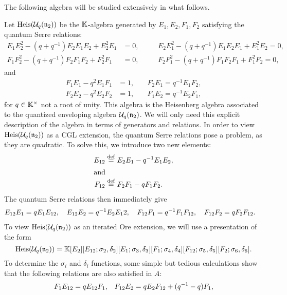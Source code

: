 The following algebra will be studied extensively in what follows.
\begin{example}\label{exmp:heisenberg}
	Let $\operatorname{Heis}(\mathcal{U}_q(\mathfrak{n}_2))$ be the $\mathbb{K}$-algebra generated by $E_1, E_2, F_1, F_2$ satisfying the quantum Serre relations:
	\begin{align*}
		E_1 E_2^2 - (q + q^{-1}) E_2 E_1 E_2 + E_2^2 E_1 & = 0,\quad &  & E_2 E_1^2 - (q + q^{-1}) E_1 E_2 E_1 + E_1^2 E_2 = 0, \\
		F_1 F_2^2 - (q + q^{-1}) F_2 F_1 F_2 + F_2^2 F_1 & = 0,\quad &  & F_2 F_1^2 - (q + q^{-1}) F_1 F_2 F_1 + F_1^2 F_2 = 0,
	\end{align*}
	and
	\begin{align*}
		F_1 E_1 - q^2 E_1 F_1 & = 1, \quad & F_2 E_1 = q^{-1}E_1 F_2, \\
		F_2 E_2 - q^2 E_2 F_2 & = 1, \quad & F_1 E_2 = q^{-1}E_2 F_1,
	\end{align*}
	for $q \in \mathbb{K}^\times$ not a root of unity. This algebra is the Heisenberg algebra
	associated to the quantized enveloping algebra $\mathcal{U}_q(\mathfrak{n}_2)$. We will only
	need this explicit description of the algebra in terms of generators and relations. In
	order to view $\operatorname{Heis}(\mathcal{U}_q(\mathfrak{n}_2))$ as a CGL extension, the quantum Serre relations pose a
	problem, as they are quadratic. To solve this, we introduce two new elements:
	\begin{align*}
		E_{12} & \overset{\mathrm{def}}{=} E_2 E_1 - q^{-1}E_1 E_2, \\
		\shortintertext{and}
		F_{12} & \overset{\mathrm{def}}{=} F_2 F_1 - qF_1 F_2.
	\end{align*}
	The quantum Serre relations then immediately give
	\begin{align*}
		E_{12}E_1 & = q E_1 E_{12}, \quad E_{12}E_2 = q^{-1} E_2 E_12, \quad F_{12}F_1 = q^{-1} F_1 F_{12}, \quad F_{12}F_2 = q F_2 F_{12}.
	\end{align*}
	To view $\operatorname{Heis}(\mathcal{U}_q(\mathfrak{n}_2))$ as an iterated Ore extension, we will use a
	presentation of the form
	\begin{equation}\label{eq:cgl_heisenberg}
		\operatorname{Heis}(\mathcal{U}_q(\mathfrak{n}_2)) = \mathbb{K}[E_2][E_{12}; \sigma_2, \delta_2][E_1;\sigma_3, \delta_3][F_1; \sigma_4, \delta_4][F_{12}; \sigma_5, \delta_5][F_2; \sigma_6, \delta_6].
	\end{equation}
	To determine the $\sigma_i$ and $\delta_i$ functions, some simple but tedious
	calculations show that the following relations are also satisfied in $A$:
	\begin{align*}
		F_1 E_{12}   & = q E_{12} F_1,                                        &  & F_{12}E_2 = q E_2 F_{12} + (q\inv - q) F_1, \\

\end{align*}
\end{example}
